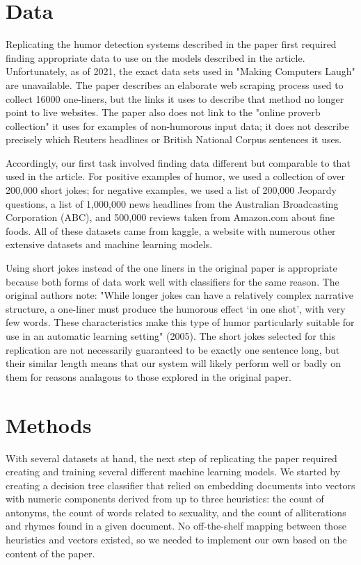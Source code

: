 \documentclass[11pt,a4paper]{article}
\begin{document}
\section{Data}
Replicating the humor detection systems described in the paper first required finding appropriate data to use on the models described in the article. Unfortunately, as of 2021, the exact data sets used in "Making Computers Laugh" are unavailable. The paper describes an elaborate web scraping process used to collect 16000 one-liners, but the links it uses to describe that method no longer point to live websites. The paper also does not link to the "online proverb collection" it uses for examples of non-humorous input data; it does not describe precisely which Reuters headlines or British National Corpus sentences it uses.

Accordingly, our first task involved finding data different but comparable to that used in the article. For positive examples of humor, we used a collection of over 200,000 short jokes; for negative examples, we used a list of 200,000 Jeopardy questions, a list of 1,000,000 news headlines from the Australian Broadcasting Corporation (ABC), and 500,000 reviews taken from Amazon.com about fine foods. \cite{short-jokes} \cite{news-headlines} \cite{jeopardy-questions} \cite{amazon-reviews} All of these datasets came from kaggle, a website with numerous other extensive datasets and machine learning models.

Using short jokes instead of the one liners in the original paper is appropriate because both forms of data work well with classifiers for the same reason. The original authors note: "While longer jokes can have a relatively complex narrative structure, a one-liner must produce the humorous effect `in one shot', with very few words. These characteristics make this type of humor particularly suitable for use in an automatic learning setting" (2005). The short jokes selected for this replication are not necessarily guaranteed to be exactly one sentence long, but their similar length means that our system will likely perform well or badly on them for reasons analagous to those explored in the original paper.

\section{Methods}
With several datasets at hand, the next step of replicating the paper required creating and training several different machine learning models. We started by creating a decision tree classifier that relied on embedding documents into vectors with numeric components derived from up to three heuristics: the count of antonyms, the count of words related to sexuality, and the count of alliterations and rhymes found in a given document. No off-the-shelf mapping between those heuristics and vectors existed, so we needed to implement our own based on the content of the paper.
\end{document}
